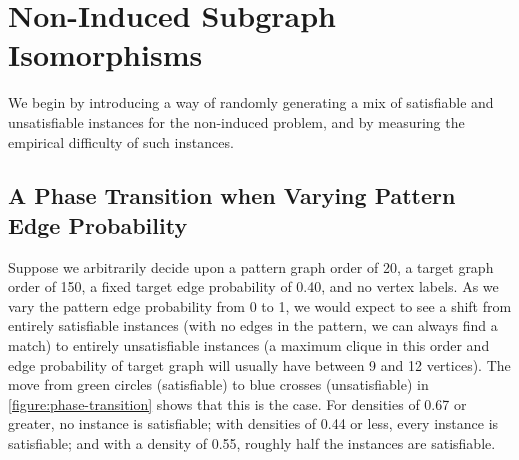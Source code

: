\documentclass[twoside,11pt]{article}
\begin{document}
\section{Non-Induced Subgraph Isomorphisms}\label{section:non-induced}

We begin by introducing a way of randomly generating a mix of satisfiable and unsatisfiable
instances for the non-induced problem, and by measuring the empirical difficulty of such instances.

\subsection{A Phase Transition when Varying Pattern Edge Probability}

Suppose we arbitrarily decide upon a pattern graph order of 20, a target graph order of 150, a fixed
target edge probability of 0.40, and no vertex labels. As we vary the pattern edge probability from
0 to 1, we would expect to see a shift from entirely satisfiable instances (with no edges in the
pattern, we can always find a match) to entirely unsatisfiable instances (a maximum clique in this
order and edge probability of target graph will usually have between 9 and 12 vertices). The move
from green circles (satisfiable) to blue crosses (unsatisfiable) in \cref{figure:phase-transition}
shows that this is the case. For densities of 0.67 or greater, no instance is satisfiable; with
densities of 0.44 or less, every instance is satisfiable; and with a density of 0.55, roughly half
the instances are satisfiable.
\end{document}
